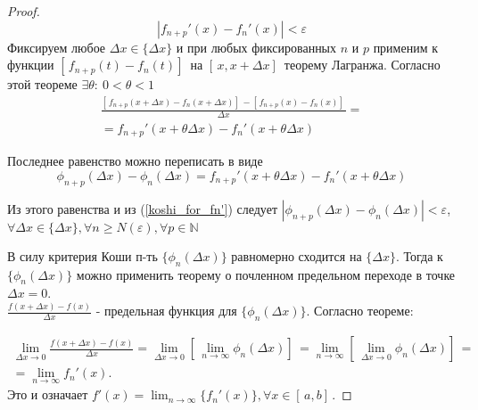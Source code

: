 \begin{proof}
    \begin{equation}\label{koshi_for_fn'}
        |f_{n+p}'(x) - f_n'(x)| < \varepsilon
    \end{equation}
    Фиксируем любое $\Delta x \in \{\Delta x\}$ и при любых фиксированных $n$ и $p$ применим к функции  $[\,f_{n+p}(t)-f_n(t)]\,$ на $[\,x, x+\Delta x]\,$ теорему Лагранжа. 
    Согласно этой теореме $\exists \theta: \ 0 < \theta < 1$  
    \begin{align*}
        \frac{[\,f_{n+p}(x + \Delta x) - f_n(x + \Delta x)]\, - [\,f_{n+p}(x) - f_n(x)]\,}{\Delta x} = \\ = f_{n+p}'(x + \theta \Delta x) - f_n'(x + \theta \Delta x)
    \end{align*}

    Последнее равенство можно переписать в виде
    \begin{equation*}
        \phi_{n+p}(\Delta x) - \phi_n(\Delta x) = f_{n+p}'(x + \theta \Delta x) - f_n'(x + \theta \Delta x)
    \end{equation*}

    Из этого равенства и из (\ref{koshi_for_fn'}) следует $|\phi_{n+p}(\Delta x) - \phi_n(\Delta x)| < \varepsilon$, $\forall \Delta x \in \{\Delta x\}, \forall n \ge N(\varepsilon), \forall p \in \mathbb{N}$


    В силу критерия Коши п-ть $\{\phi_n(\Delta x)\}$ равномерно сходится на $\{\Delta x\}$. Тогда к $\{\phi_n(\Delta x)\}$ можно применить теорему о почленном предельном переходе в точке  $\Delta x = 0$. \\
    $\frac{f(x + \Delta x) - f(x)}{\Delta x}$ - предельная функция для $\{\phi_n(\Delta x)\}$. Согласно теореме:
  
    \begin{align*}
        \lim_{\Delta x \rightarrow 0}{\frac{f(x + \Delta x) - f(x)}{\Delta x}} = \lim_{\Delta x \rightarrow 0}{[\,\lim_{n \rightarrow \infty}{\phi_n(\Delta x)}]\,} = \lim_{n \rightarrow \infty}{[\,\lim_{\Delta x \rightarrow 0}{\phi_n(\Delta x)}]\,} = \\ = \lim_{n \rightarrow \infty}{f_n'(x)}.
    \end{align*}
    Это и означает $f'(x) = \lim_{n \rightarrow \infty}{\{f_n'(x)\}}, \forall x \in [\,a,b]\,$.
\end{proof}
